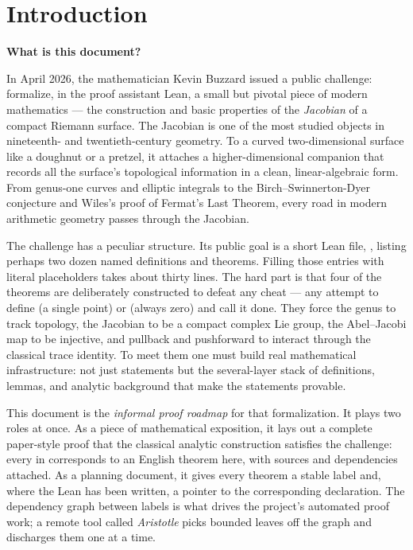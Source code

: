 \section*{Introduction}
\label{sec:introduction}

\begin{layman}
\textbf{What is this document?}\par

In April 2026, the mathematician Kevin Buzzard issued a public
challenge: formalize, in the proof assistant Lean, a small but
pivotal piece of modern mathematics --- the construction and basic
properties of the \emph{Jacobian} of a compact Riemann surface. The
Jacobian is one of the most studied objects in nineteenth- and
twentieth-century geometry. To a curved two-dimensional surface
like a doughnut or a pretzel, it attaches a higher-dimensional
companion that records all the surface's topological information in
a clean, linear-algebraic form. From genus-one curves and elliptic
integrals to the Birch--Swinnerton-Dyer conjecture and Wiles's proof
of Fermat's Last Theorem, every road in modern arithmetic geometry
passes through the Jacobian.

The challenge has a peculiar structure. Its public goal is a short
Lean file, , listing perhaps two dozen
named definitions and theorems. Filling those entries with literal
 placeholders takes about thirty lines. The hard part
is that four of the theorems are deliberately constructed to defeat
any cheat --- any attempt to define  (a
single point) or  (always zero) and call it done.
They force the genus to track topology, the Jacobian to be a
compact complex Lie group, the Abel--Jacobi map to be
injective, and pullback and pushforward to interact through the
classical trace identity. To meet them one must build real
mathematical infrastructure: not just statements but the
several-layer stack of definitions, lemmas, and analytic background
that make the statements provable.

This document is the \emph{informal proof roadmap} for that
formalization. It plays two roles at once. As a piece of
mathematical exposition, it lays out a complete paper-style proof
that the classical analytic construction satisfies the challenge:
every  in  corresponds to an
English theorem here, with sources and dependencies attached. As a
planning document, it gives every theorem a stable label and,
where the Lean has been written, a pointer to the corresponding
declaration. The dependency graph between labels is what drives the
project's automated proof work; a remote tool called
\emph{Aristotle} picks bounded leaves off the graph and discharges
them one at a time.


\end{layman}
